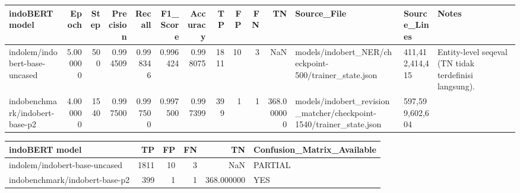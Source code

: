 \begin{tabular}{lrrrrrrrrrrlll}
\toprule
indoBERT model & Epoch & Step & Precision & Recall & F1_Score & Accuracy & TP & FP & FN & TN & Source_File & Source_Lines & Notes \\
\midrule
indolem/indobert-base-uncased & 5.000000 & 500 & 0.994509 & 0.998346 & 0.996424 & 0.998075 & 1811 & 10 & 3 & NaN & models/indobert_NER/checkpoint-500/trainer_state.json & 411,412,414,415 & Entity-level seqeval (TN tidak terdefinisi langsung). \\
indobenchmark/indobert-base-p2 & 4.000000 & 1540 & 0.997500 & 0.997500 & 0.997500 & 0.997399 & 399 & 1 & 1 & 368.000000 & models/indobert_revision_matcher/checkpoint-1540/trainer_state.json & 597,599,602,604 &  \\
\bottomrule
\end{tabular}


\begin{tabular}{lrrrrl}
\toprule
indoBERT model & TP & FP & FN & TN & Confusion_Matrix_Available \\
\midrule
indolem/indobert-base-uncased & 1811 & 10 & 3 & NaN & PARTIAL \\
indobenchmark/indobert-base-p2 & 399 & 1 & 1 & 368.000000 & YES \\
\bottomrule
\end{tabular}
